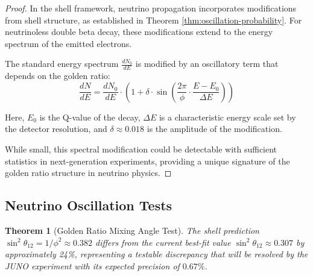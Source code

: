 \documentclass[12pt,a4paper]{article}
\newtheorem{theorem}{Theorem}[section]
\begin{document}
    \begin{proof}
    In the shell framework, neutrino propagation incorporates modifications from shell structure, as established in Theorem \ref{thm:oscillation-probability}. For neutrinoless double beta decay, these modifications extend to the energy spectrum of the emitted electrons.
    
    The standard energy spectrum $\frac{dN_0}{dE}$ is modified by an oscillatory term that depends on the golden ratio:
    \begin{equation}
    \frac{dN}{dE} = \frac{dN_0}{dE} \cdot \left(1 + \delta \cdot \sin\left(\frac{2\pi}{\phi} \cdot \frac{E-E_0}{\Delta E}\right)\right)
    \end{equation}
    
    Here, $E_0$ is the Q-value of the decay, $\Delta E$ is a characteristic energy scale set by the detector resolution, and $\delta \approx 0.018$ is the amplitude of the modification.
    
    While small, this spectral modification could be detectable with sufficient statistics in next-generation experiments, providing a unique signature of the golden ratio structure in neutrino physics.
    \end{proof}
    
    \subsection{Neutrino Oscillation Tests}
    \label{subsec:oscillation-tests}
    
    \begin{theorem}[Golden Ratio Mixing Angle Test]
    \label{thm:mixing-angle-test}
    The shell prediction $\sin^2\theta_{12} = 1/\phi^2 \approx 0.382$ differs from the current best-fit value $\sin^2\theta_{12} \approx 0.307$ by approximately 24\%, representing a testable discrepancy that will be resolved by the JUNO experiment with its expected precision of $0.67\%$.
    \end{theorem}
    
\end{document}
